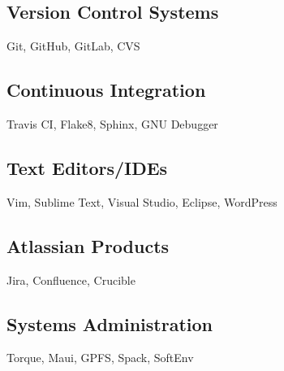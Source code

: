 
\subsection{Version Control Systems}
Git, GitHub, GitLab, CVS

\subsection{Continuous Integration}
Travis CI, Flake8, Sphinx, GNU Debugger

\subsection{Text Editors/IDEs}
Vim, Sublime Text, Visual Studio, Eclipse, WordPress

\subsection{Atlassian Products}
Jira, Confluence, Crucible

\subsection{Systems Administration}
Torque, Maui, GPFS, Spack, SoftEnv
